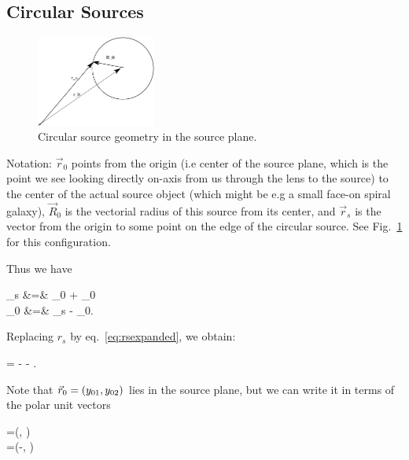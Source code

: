 \subsection{Circular Sources}

\begin{figure}
  \begin{center}
   \includegraphics[width=0.35\textwidth]{graphics/sourceplane.pdf}
  \end{center}
    \caption{\label{fig:circular_source}Circular source geometry in the source
plane.}
\end{figure}

Notation: $ \vec{r}_{0}$ points from the origin (i.e center of the
source plane, which is the point we see looking directly on-axis from
us through the lens to the source) to the center of the actual source
object (which might be e.g a small face-on spiral galaxy), $
\vec{R}_{0}$ is the vectorial radius of this source from its center,
and $ \vec{r}_{s}$ is the vector from the origin to some point on the
edge of the circular source. See Fig.~\ref{fig:circular_source} for this
configuration.



Thus we have

\bea
{}_s &=&  _{0} + _{0} \\
  _{0} &=& _s - _{0}. \nonumber
\eea


Replacing $r_s$ by eq.~\eqref{eq:rsexpanded}, we obtain:

\beq
\label{eq:Rzero}
 =  - 
 \hat{\theta} - . \;\;\;
\eeq


Note that $\vec{r}_{0} = (y_{01},y_{02})$ lies in the source plane, but we
can write it in terms of the polar unit vectors

\bea
\label{eq:unitvs}
=(\cos\te, \sin \te) \\
\hat{\theta}=(-\sin \te, \cos \te)
\eea

